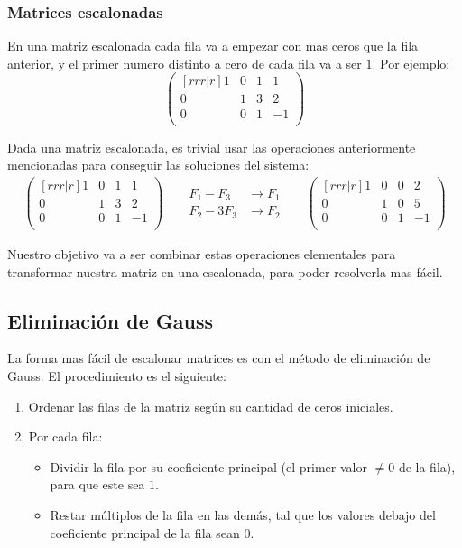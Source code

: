 \documentclass[../teoria.root.tex]{subfiles}
\begin{document}
\subsubsection{Matrices escalonadas}

En una matriz escalonada cada fila va a empezar con mas ceros que la fila
anterior, y el primer numero distinto a cero de cada fila va a ser $1$. Por
ejemplo:
\[\begin{pmatrix}[rrr|r]
	1 & 0 & 1 &  1\\
	0 & 1 & 3 &  2\\
	0 & 0 & 1 & -1\\
\end{pmatrix}\]

Dada una matriz escalonada, es trivial usar las operaciones anteriormente
mencionadas para conseguir las soluciones del sistema:
\begin{align*}
	\begin{pmatrix}[rrr|r]
		1 & 0 & 1 &  1\\
		0 & 1 & 3 &  2\\
		0 & 0 & 1 & -1\\
	\end{pmatrix}
	&&\begin{aligned}
		F_1-F_3&\to F_1\\
		F_2-3F_3&\to F_2
	\end{aligned}
	&&\begin{pmatrix}[rrr|r]
		1 & 0 & 0 &  2\\
		0 & 1 & 0 &  5\\
		0 & 0 & 1 & -1\\
	\end{pmatrix}
\end{align*}

Nuestro objetivo va a ser combinar estas operaciones elementales para
transformar nuestra matriz en una escalonada, para poder resolverla mas fácil.

\subsection{Eliminación de Gauss}

La forma mas fácil de escalonar matrices es con el método de eliminación de
Gauss. El procedimiento es el siguiente:

\begin{enumerate}
	\item Ordenar las filas de la matriz según su cantidad de ceros iniciales.
	\item Por cada fila:
		\begin{itemize}
			\item Dividir la fila por su coeficiente principal (el primer valor
				$\neq0$ de la fila), para que este sea $1$.
			\item Restar múltiplos de la fila en las demás, tal que los valores
				debajo del coeficiente principal de la fila sean $0$.
		\end{itemize}
\end{enumerate}
\end{document}
